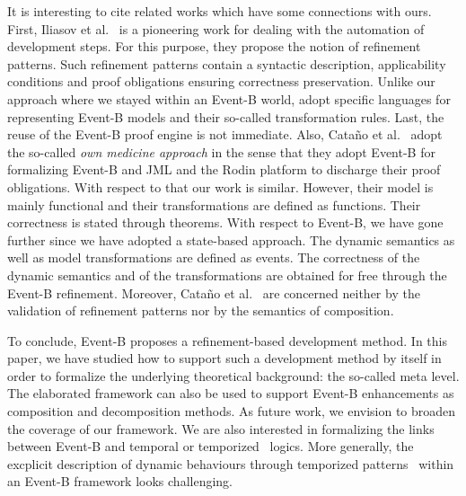 \documentclass{llncs}
\begin{document}
    It is interesting to cite related works which have some connections
with ours.  First, Iliasov et al.~\cite{[ITLR09]} is a pioneering work
for dealing with the automation of development steps. For this
purpose, they propose the notion of refinement patterns.  Such
refinement patterns contain a syntactic description, applicability
conditions and proof obligations ensuring correctness preservation.
Unlike our approach where we stayed within an Event-B world,
\cite{[ITLR09]} adopt specific languages for representing Event-B
models and their so-called transformation rules. Last, the reuse of
the Event-B proof engine is not immediate.  Also, Cata{\~{n}}o et
al.~\cite{[CRW13]} adopt the so-called \textit{own medicine approach}
in the sense that they adopt Event-B for formalizing Event-B and JML
and the Rodin platform to discharge their proof obligations. With
respect to that our work is similar. However, their model is mainly
functional and their transformations are defined as functions. Their
correctness is stated through theorems. With respect to Event-B, we
have gone further since we have adopted a state-based approach. The
dynamic semantics as well as model transformations are defined as
events.  The correctness of the dynamic semantics and of the
transformations are obtained for free through the Event-B refinement.
Moreover, Cata{\~{n}}o et al.~\cite{[CRW13]} are concerned neither by
the validation of refinement patterns nor by the semantics of
composition.

   To conclude, Event-B proposes a refinement-based development method. In this
paper, we have studied how to support such a development method by
itself in order to formalize the underlying theoretical background:
the so-called meta level. The elaborated framework can also be used to
support Event-B enhancements as composition and decomposition methods.
As future work, we envision to broaden the coverage of our
framework. We are also interested in formalizing the links between
Event-B and temporal\cite{Hoang2016} or temporized~\cite{[GBF13]}
logics. More generally, the excplicit description of dynamic
behaviours through temporized patterns~\cite{[ADL12]} within an
Event-B framework looks challenging.




\end{document}
